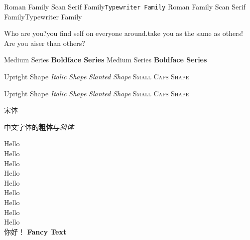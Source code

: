 \documentclass[10pt]{article}	%
\newcommand{\myfont}{\textbf{\textsf{Fancy Text}}}	%
\begin{document}
	
	\textrm{Roman Family} \textsf{Scan Serif Family}\texttt{Typewriter Family}
	{\rmfamily Roman Family} {\sffamily Scan Serif Family}{\ttfamily Typewriter Family}
	
	{\sffamily Who are you?you find self on everyone around.take you as the same as others!}
	{\ttfamily Are you aiser than others?}
	
	\textmd{Medium Series} \textbf{Boldface Series}	%
	{\mdseries Medium Series} {\bfseries Boldface Series}	%
	
	
	\textup{Upright Shape} \textit{Italic Shape} %
	\textsl{Slanted Shape} \textsc{Small Caps Shape}
	
	{\upshape Upright Shape} {\itshape Italic Shape }	%
	{\slshape Slanted Shape}
	{\scshape Small Caps Shape}
	
	{\songti 宋体}   	%
	
	中文字体的\textbf{粗体}与\textit{斜体}
	
	{\tiny  		Hello }\\
	{\scriptsize  	Hello }\\
	{\footnotesize  Hello }\\
	{\small  		Hello }\\
	{\normalsize 	Hello }\\
	{\large  		Hello }\\
	{\Large  		Hello }\\
	{\LARGE  		Hello }\\
	{\huge  		Hello }\\ 
	
	你好！
	\myfont	%
	
	
\end{document}
